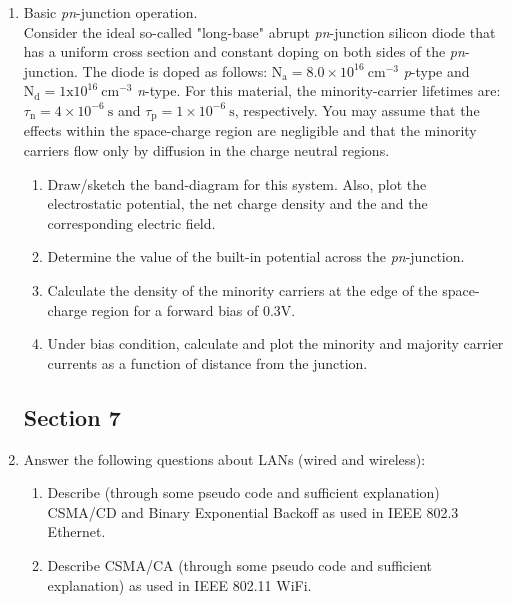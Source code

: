 \documentclass[main.tex]{subfiles}
\begin{document}
\begin{enumerate}
\item Basic \textit{pn}-junction operation.\\

Consider the ideal so-called "long-base" abrupt \textit{pn}-junction silicon diode that has a uniform cross section and constant doping on both sides of the \textit{pn}-junction. The diode is doped as follows: $\mathrm{N}_{\mathrm{a}}=8.0 \times 10^{16} \mathrm{~cm}^{-3}$ \textit{p}-type and $\mathrm{N}_{\mathrm{d}}=1 \mathrm{x} 10^{16} \mathrm{~cm}^{-3}$ \textit{n}-type. For this material, the minority-carrier lifetimes are: $\tau_{\mathrm{n}}=4 \times 10^{-6} \mathrm{~s}$ and $\tau_{\mathrm{p}}=1 \times 10^{-6} \mathrm{~s}$, respectively. You may assume that the effects within the space-charge region are negligible and that the minority carriers flow only by diffusion in the charge neutral regions.

    \begin{enumerate}
        \item Draw/sketch the band-diagram for this system. Also, plot the electrostatic potential, the net charge density and the and the corresponding electric field.
        \item Determine the value of the built-in potential across the \textit{pn}-junction.
        \item Calculate the density of the minority carriers at the edge of the space-charge region for a forward bias of 0.3V.
        \item Under bias condition, calculate and plot the minority and majority carrier currents as a function of distance from the junction.
    \end{enumerate}

\subsection{Section 7}
	
\item Answer the following questions about LANs (wired and wireless):

    \begin{enumerate}
        \item Describe (through some pseudo code and sufficient explanation) CSMA/CD and Binary Exponential Backoff as used in IEEE 802.3 Ethernet.
        \item Describe CSMA/CA (through some pseudo code and sufficient explanation) as used in IEEE 802.11 WiFi.
    \end{enumerate}
    

\end{enumerate}
\end{document}

